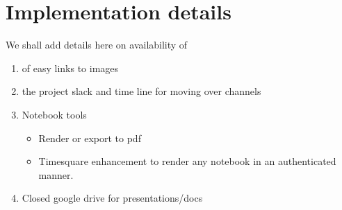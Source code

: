 \section{Implementation details} \label{sec:implementation}

We shall add details here on availability of

\begin{enumerate}
\item of easy links to images
\item the project slack  and time line for moving over channels
\item Notebook tools

\begin{itemize}
\item Render or export to pdf
\item Timesquare enhancement to render any notebook in an authenticated manner.

\end{itemize}
\item Closed google drive for presentations/docs
\end{enumerate}
